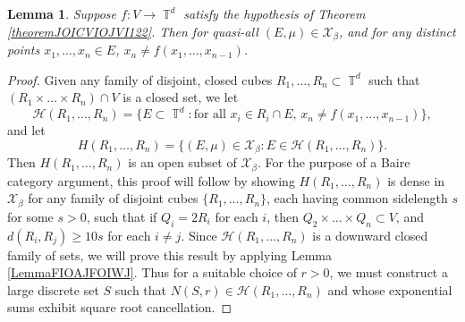 \documentclass[dvipsnames,letterpaper,12pt]{article}
\numberwithin{equation}{section}
\DeclareMathOperator{\TT}{\mathbb{T}}
\newtheorem{lemma}[theorem]{Lemma}
\numberwithin{theorem}{section}
\begin{document}
\begin{lemma} \label{lemmaOIOICJOIJOISJOIJS}
    Suppose $f: V \to \TT^d$ satisfy the hypothesis of Theorem \ref{theoremJOICVIOJVI122}. Then for quasi-all $(E,\mu) \in \mathcal{X}_\beta$, and for any distinct points $x_1,\dots,x_n \in E$, $x_n \neq f(x_1,\dots,x_{n-1})$.
\end{lemma}
\begin{proof}
    Given any family of disjoint, closed cubes $R_1,\dots,R_n \subset \TT^d$ such that $(R_1 \times \dots \times R_n) \cap V$ is a closed set, we let
    \[ \mathcal{H}(R_1,\dots,R_n) = \{ E \subset \TT^d: \text{for all $x_i \in R_i \cap E$, $x_n \neq f(x_1,\dots,x_{n-1})$} \}, \]
    and let
    \[ H(R_1,\dots,R_n) = \{ (E,\mu) \in \mathcal{X}_\beta: E \in \mathcal{H}(R_1,\dots,R_n) \}. \]
    Then $H(R_1,\dots,R_n)$ is an open subset of $\mathcal{X}_\beta$. For the purpose of a Baire category argument, this proof will follow by showing $H(R_1,\dots,R_n)$ is dense in $\mathcal{X}_\beta$ for any family of disjoint cubes $\{ R_1,\dots, R_n \}$, each having common sidelength $s$ for some $s > 0$, such that if $Q_i = 2R_i$ for each $i$, then $Q_2 \times \dots \times Q_n \subset V$, and $d(R_i,R_j) \geq 10s$ for each $i \neq j$. Since $\mathcal{H}(R_1,\dots,R_n)$ is a downward closed family of sets, we will prove this result by applying Lemma \ref{LemmaFIOAJFOIWJ}. Thus for a suitable choice of $r > 0$, we must construct a large discrete set $S$ such that $N(S,r) \in \mathcal{H}(R_1,\dots,R_n)$ and whose exponential sums exhibit square root cancellation.


\end{proof}
\end{document}
